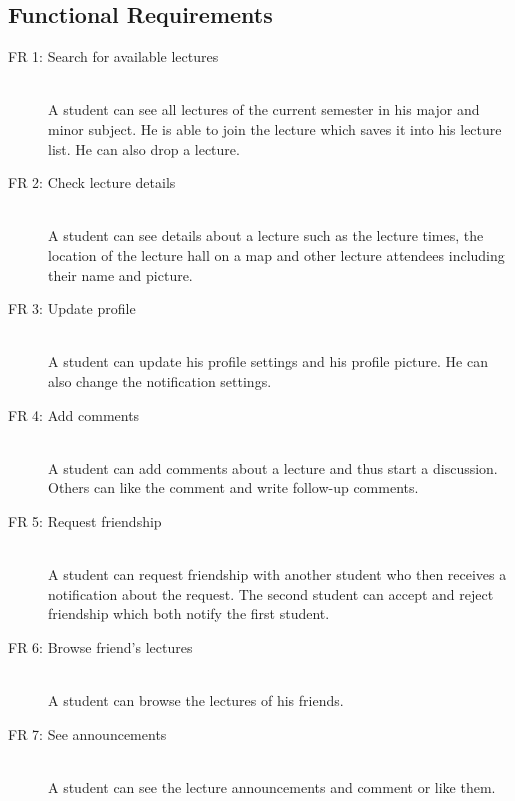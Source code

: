 \documentclass[a4paper,12pt,halfparskip]{scrartcl}
\newenvironment{subs}
{\adjustwidth{3em}{0pt}}
{\endadjustwidth}
\begin{document}
    \nopagebreak
    \begin{subs}
        \subsection{Functional Requirements}
        \begin{description}
            \item[FR 1: Search for available lectures] \hfill \\ A student can see all lectures of the current semester
            in his major and minor subject.
            He is able to join the lecture which saves it into his lecture list.
            He can also drop a lecture.

            \item[FR 2: Check lecture details] \hfill \\ A student can see details about a lecture such as the lecture
            times, the location of the lecture hall on a map and other lecture attendees including their
            name and picture.

            \item[FR 3: Update profile] \hfill \\ A student can update his profile settings and his profile picture. He
            can also change the notification settings.

            \item[FR 4: Add comments] \hfill \\ A student can add comments about a lecture and thus start a discussion.
            Others can like the comment and write follow-up comments.

            \item[FR 5: Request friendship] \hfill \\ A student can request friendship with another student who then
            receives a notification about the request.
            The second student can accept and reject friendship which both notify the first student.

            \item[FR 6: Browse friend’s lectures] \hfill \\ A student can browse the lectures of his friends.

            \item[FR 7: See announcements] \hfill \\ A student can see the lecture announcements and comment
            or like them.


\end{description}
\end{subs}
\end{document}
